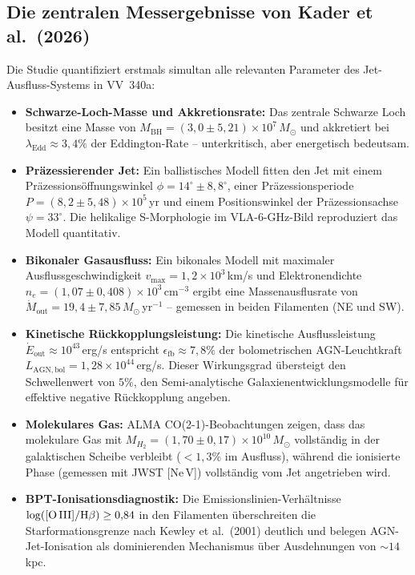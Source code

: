 ﻿\documentclass[12pt,a4paper]{report}
\begin{document}
\subsection{Die zentralen Messergebnisse von Kader et al.\ (2026)}

Die Studie quantifiziert erstmals simultan alle relevanten Parameter des Jet-Ausfluss-Systems in VV~340a:

\begin{itemize}
	\item \textbf{Schwarze-Loch-Masse und Akkretionsrate:} Das zentrale Schwarze Loch besitzt eine Masse von $M_\mathrm{BH} = (3{,}0 \pm 5{,}21) \times 10^7\,M_\odot$ und akkretiert bei $\lambda_\mathrm{Edd} \approx 3{,}4\%$ der Eddington-Rate -- unterkritisch, aber energetisch bedeutsam.

	\item \textbf{Präzessierender Jet:} Ein ballistisches Modell fitten den Jet mit einem Präzessions\-öffnungswinkel $\phi = 14^\circ \pm 8{,}8^\circ$, einer Präzessionsperiode $P = (8{,}2 \pm 5{,}48) \times 10^5$\,yr und einem Positionswinkel der Präzessionsachse $\psi = 33^\circ$. Die helikalige S-Morphologie im VLA-6-GHz-Bild reproduziert das Modell quantitativ.

	\item \textbf{Bikonaler Gasausfluss:} Ein bikonales Modell mit maximaler Ausflussgeschwindigkeit $v_\mathrm{max} = 1{,}2 \times 10^3$\,km/s und Elektronendichte $n_e = (1{,}07 \pm 0{,}408) \times 10^3$\,cm$^{-3}$ ergibt eine Massenausflusrate von $\dot{M}_\mathrm{out} = 19{,}4 \pm 7{,}85\,M_\odot$\,yr$^{-1}$ -- gemessen in beiden Filamenten (NE und SW).

	\item \textbf{Kinetische Rückkopplungsleistung:} Die kinetische Ausflussleistung $\dot{E}_\mathrm{out} \approx 10^{43}$\,erg/s entspricht $\epsilon_\mathrm{fb} \approx 7{,}8\%$ der bolometrischen AGN-Leuchtkraft $L_\mathrm{AGN,bol} = 1{,}28 \times 10^{44}$\,erg/s. Dieser Wirkungsgrad übersteigt den Schwellenwert von $5\%$, den Semi-analytische Galaxienentwicklungsmodelle für effektive negative Rückkopplung angeben.

	\item \textbf{Molekulares Gas:} ALMA CO(2-1)-Beobachtungen zeigen, dass das molekulare Gas mit $M_{H_2} = (1{,}70 \pm 0{,}17) \times 10^{10}\,M_\odot$ vollständig in der galaktischen Scheibe verbleibt ($<1{,}3\%$ im Ausfluss), während die ionisierte Phase (gemessen mit JWST [Ne\,V]) vollständig vom Jet angetrieben wird.

	\item \textbf{BPT-Ionisationsdiagnostik:} Die Emissionslinien-Verhältnisse $\log([\text{O\,III}]/\text{H}\beta) \geq 0{,}84$ in den Filamenten überschreiten die Starformationsgrenze nach Kewley et al.\ (2001) deutlich und belegen AGN-Jet-Ionisation als dominierenden Mechanismus über Ausdehnungen von $\sim 14$\,kpc.
\end{itemize}
\end{document}
